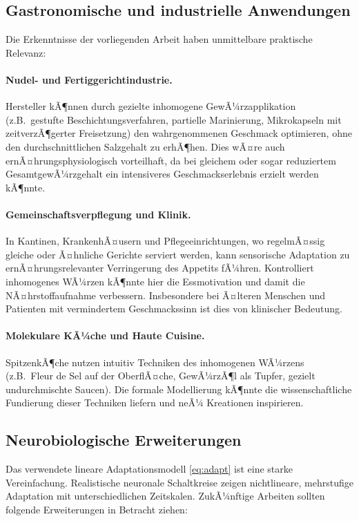 ﻿\documentclass[12pt,a4paper]{article}
\theoremstyle{definition}
\begin{document}
\subsection{Gastronomische und industrielle Anwendungen}

Die Erkenntnisse der vorliegenden Arbeit haben unmittelbare praktische
Relevanz:

\paragraph{Nudel- und Fertiggerichtindustrie.}
Hersteller kÃ¶nnen durch gezielte inhomogene GewÃ¼rzapplikation
(z.B.\ gestufte Beschichtungsverfahren, partielle Marinierung, Mikrokapseln
mit zeitverzÃ¶gerter Freisetzung) den wahrgenommenen Geschmack optimieren,
ohne den durchschnittlichen Salzgehalt zu erhÃ¶hen. Dies wÃ¤re auch
ernÃ¤hrungsphysiologisch vorteilhaft, da bei gleichem oder sogar
reduziertem GesamtgewÃ¼rzgehalt ein intensiveres Geschmackserlebnis
erzielt werden kÃ¶nnte.

\paragraph{Gemeinschaftsverpflegung und Klinik.}
In Kantinen, KrankenhÃ¤usern und Pflegeeinrichtungen, wo regelmÃ¤ssig
gleiche oder Ã¤hnliche Gerichte serviert werden, kann sensorische Adaptation
zu ernÃ¤hrungsrelevanter Verringerung des Appetits fÃ¼hren. Kontrolliert
inhomogenes WÃ¼rzen kÃ¶nnte hier die Essmotivation und damit die
NÃ¤hrstoffaufnahme verbessern. Insbesondere bei Ã¤lteren Menschen und
Patienten mit vermindertem Geschmackssinn ist dies von klinischer Bedeutung.

\paragraph{Molekulare KÃ¼che und Haute Cuisine.}
SpitzenkÃ¶che nutzen intuitiv Techniken des inhomogenen WÃ¼rzens
(z.B.\ Fleur de Sel auf der OberflÃ¤che, GewÃ¼rzÃ¶l als Tupfer,
gezielt undurchmischte Saucen). Die formale Modellierung kÃ¶nnte
die wissenschaftliche Fundierung dieser Techniken liefern und neÃ¼
Kreationen inspirieren.

\subsection{Neurobiologische Erweiterungen}

Das verwendete lineare Adaptationsmodell \eqref{eq:adapt} ist eine
starke Vereinfachung. Realistische neuronale Schaltkreise zeigen
nichtlineare, mehrstufige Adaptation mit unterschiedlichen Zeitskalen.
ZukÃ¼nftige Arbeiten sollten folgende Erweiterungen in Betracht ziehen:
\end{document}
